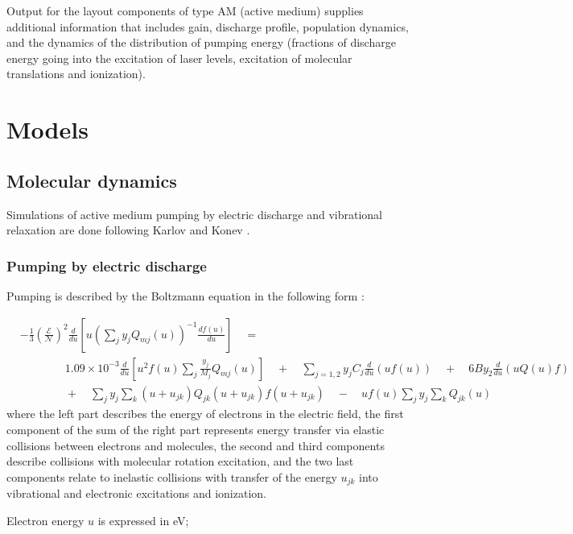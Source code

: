 \documentclass{report}
\begin{document}
Output for the layout components of type AM (active medium) supplies  additional information that includes gain, discharge profile, population dynamics, and the dynamics of the distribution of pumping energy  (fractions of discharge energy going into the excitation of laser levels, excitation of molecular translations and ionization).


\chapter{Models}

\section{Molecular dynamics}
Simulations of active medium pumping by electric discharge and vibrational relaxation are done following Karlov and Konev  \cite{Karlov-1978}.

\subsection{Pumping by electric discharge}
Pumping is described by the Boltzmann equation in the following form \cite{Holstein-1946,Nighan-1970}:

\begin{align}\label{eq:boltzmann}
&- \frac{1}{3} \left(\frac{\mathcal{E}}{\mathcal{N}}\right)^2 \frac{d}{du} \left[u \left( \sum\limits_j y_j Q_{mj}(u) \right)^{-1}\frac{df(u)}{du} \right] \quad = \nonumber \\
&\qquad \qquad 1.09 \times 10^{ - 3}\frac{d}{du}\left[ u^2 f(u)\sum\limits_j \frac{y_j}{M_j} Q_{mj}(u) \right]
\quad  + \quad \sum\limits_{j = 1,2} {y_j}{C_j} \frac{d}{du}(uf(u))
\quad  + \quad 6B y_2 \frac{d}{du}\left(uQ(u)f \right)\nonumber \\
&\qquad \qquad +\quad\sum\limits_j y_j \sum\limits_k (u + u_{jk})Q_{jk} (u + u_{jk})f(u + u_{jk}) \quad  - \quad uf(u)\sum\limits_j y_j \sum\limits_k Q_{jk}(u)
\end{align}
where the left part describes the energy of electrons in the electric field, the first component of the sum of the right part represents energy transfer via elastic collisions between electrons and molecules, the second and third components describe collisions with molecular rotation excitation, and the two last components relate to inelastic collisions with transfer of the energy $u_{jk}$ into vibrational and electronic excitations and ionization.

Electron energy $u$ is expressed in eV;
\end{document}
